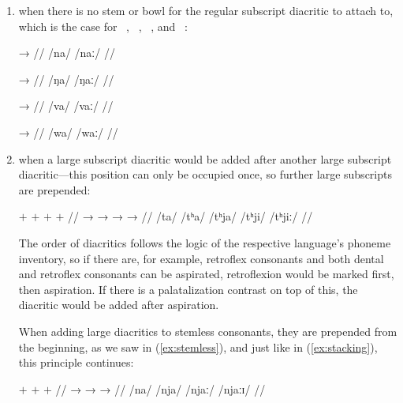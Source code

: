 \begin{enumerate}
\item when there is no stem or bowl for the regular subscript diacritic to 
	attach to, which is the case for ~, ~, 
	~, and ~:
	
	\begin{multicols}{2}
	\pex[lingstyle=thex,]\label{ex:stemless}
	\a\begingl
		\gla {} →  //
		\glb /na/ {} /naː/ //
	\endgl
	
	\a\begingl
		\gla {} →  //
		\glb /ŋa/ {} /ŋaː/ //
	\endgl
	
	\a\begingl
		\gla {} →  //
		\glb /va/ {} /vaː/ //
	\endgl
	
	\a\begingl
		\gla {} →  //
		\glb /wa/ {} /waː/ //
	\endgl
	
	\xe
	\end{multicols}

\item when a large subscript diacritic would be added after another large 
	subscript diacritic---this position can only be occupied once, so 
	further large subscripts are prepended:
	
	\ex[lingstyle=thex,everygla=\normalsize,everyglb=\upshape\Large,
		aboveglcskip=0.5em,numoffset=\leftmargin]\label{ex:stacking}
	\begingl
		\gla {} {$+$ } {} {$+$ } {} {$+$ } {}
			{$+$ } {} //
		\glb {} →  →  →  → 
			 //
		\glc /ta/ {} /tʰa/ {} /tʰja/ {} /tʰji/ {} /tʰjiː/ //
	\endgl\xe
	
	The order of diacritics follows the logic of the respective 
	language's phoneme inventory, so if there are, for example, 
	retroflex consonants and both dental and retroflex consonants can be 
	aspirated, retroflexion would be marked first, then aspiration. If 
	there is a palatalization contrast on top of this, the diacritic would 
	be added after aspiration.
	
	When adding large diacritics to stemless consonants, they are prepended 
	from the beginning, as we saw in (\ref{ex:stemless}), and just like in 
	(\ref{ex:stacking}), this principle continues:
	
	\ex[lingstyle=thex,everygla=\normalsize,everyglb=\upshape\Large,
		aboveglcskip=0.5em,numoffset=\leftmargin]
	\begingl
		\gla {} {$+$ } {} {$+$ } {} {$+$ } 
			{} //
		\glb {} →  →  →  //
		\glc /na/ {} /nja/ {} /njaː/ {} /njaːɪ/ //
	\endgl\xe


\end{enumerate}
